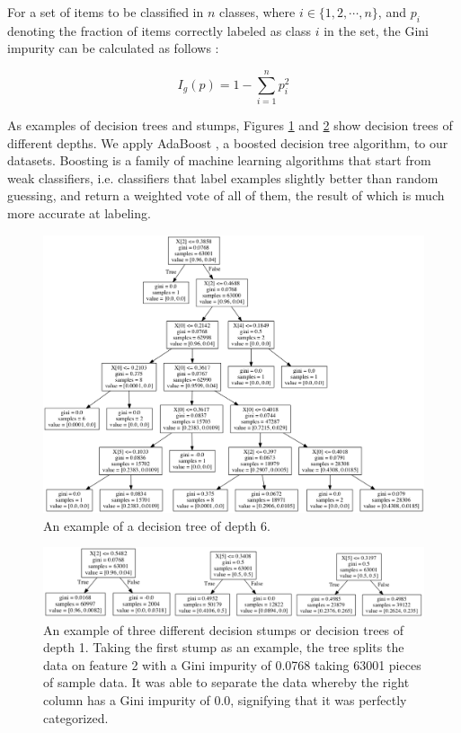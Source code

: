 \documentclass[5p]{elsarticle}
\begin{document}
For a set of items to be classified in $n$ classes, where $i \in \{ 1, 2, \cdots , n \} $, and $p_i$ denoting the fraction of items correctly labeled as class $i$ in the set, the Gini impurity can be calculated as follows \cite{thirteen}:

\begin{equation} I_g(p)=1-\sum_{i=1}^{n}p_i^2 
\end{equation}

As examples of decision trees and stumps, Figures \ref{fig:tree} and \ref{fig:stumps} show decision trees of different depths.	
We apply AdaBoost \cite{fourteen}, a boosted decision tree algorithm, to our datasets. Boosting is a family of machine learning algorithms that start from weak classifiers, i.e. classifiers that label examples slightly better than random guessing, and return a weighted vote of all of them, the result of which is much more accurate at labeling.

\begin{figure}[htbp]
    \centering
    \includegraphics[width=\linewidth]{tree.png}
    \caption{An example of a decision tree of depth 6.}
    \label{fig:tree}
\end{figure}

\begin{figure}[htbp]
    \centering
    \includegraphics[width=\linewidth]{stumps.png}
    \caption{An example of three different decision stumps or decision trees of depth 1. Taking the first stump as an example, the tree splits the data on feature 2 with a Gini impurity of 0.0768 taking 63001 pieces of sample data. It was able to separate the data whereby the right column has a Gini impurity of 0.0, signifying that it was perfectly categorized.}
    \label{fig:stumps}
\end{figure}
\end{document}
